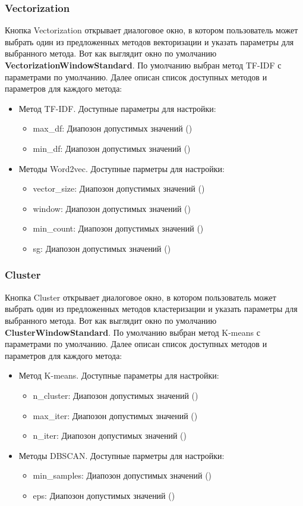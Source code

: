 		\subsubsection{Vectorization}
			Кнопка Vectorization открывает диалоговое окно, в котором пользователь может выбрать один из предложенных методов векторизации и указать параметры для выбранного метода. Вот как выглядит окно по умолчанию \textbf{VectorizationWindowStandard}. По умолчанию выбран метод TF-IDF с параметрами по умолчанию.
			Далее описан список доступных методов и параметров для каждого метода:
			\begin{itemize}
				\item Метод TF-IDF. Доступные параметры для настройки:
					\begin{itemize}
						\item max\_df: Диапозон допустимых значений ()
						\item min\_df: Диапозон допустимых значений ()
					\end{itemize}
				\item Методы Word2vec. Доступные парметры для настройки:
					\begin{itemize}
						\item vector\_size: Диапозон допустимых значений ()
						\item window: Диапозон допустимых значений ()
						\item min\_count: Диапозон допустимых значений ()
						\item sg: Диапозон допустимых значений ()
					\end{itemize}
			\end{itemize}
			
		\subsubsection{Cluster}
			Кнопка Cluster открывает диалоговое окно, в котором пользователь может выбрать один из предложенных методов кластеризации и указать параметры для выбранного метода. Вот как выглядит окно по умолчанию \textbf{ClusterWindowStandard}. По умолчанию выбран метод K-means с параметрами по умолчанию.
			Далее описан список доступных методов и параметров для каждого метода:
			\begin{itemize}
				\item Метод K-means. Доступные параметры для настройки:
					\begin{itemize}
						\item n\_cluster: Диапозон допустимых значений ()
						\item max\_iter: Диапозон допустимых значений ()
						\item n\_iter: Диапозон допустимых значений ()
					\end{itemize}
				\item Методы DBSCAN. Доступные парметры для настройки:
					\begin{itemize}
						\item min\_samples: Диапозон допустимых значений ()
						\item eps: Диапозон допустимых значений ()
					\end{itemize}
			\end{itemize}
			
